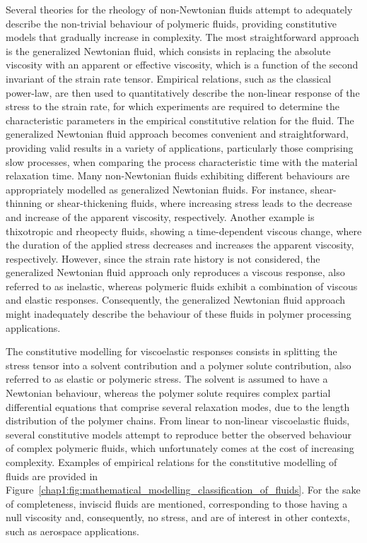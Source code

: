 Several theories for the rheology of non-Newtonian fluids attempt to adequately describe the non-trivial behaviour of polymeric fluids, providing constitutive models that gradually increase in complexity.
The most straightforward approach is the generalized Newtonian fluid, which consists in replacing the absolute viscosity with an apparent or effective viscosity, which is a function of the second invariant of the strain rate tensor.
Empirical relations, such as the classical power-law, are then used to quantitatively describe the non-linear response of the stress to the strain rate, for which experiments are required to determine the characteristic parameters in the empirical constitutive relation for the fluid.
The generalized Newtonian fluid approach becomes convenient and straightforward, providing valid results in a variety of applications, particularly those comprising slow processes, when comparing the process characteristic time with the material relaxation time.
Many non-Newtonian fluids exhibiting different behaviours are appropriately modelled as generalized Newtonian fluids.
For instance, shear-thinning or shear-thickening fluids, where increasing stress leads to the decrease and increase of the apparent viscosity, respectively.
Another example is thixotropic and rheopecty fluids, showing a time-dependent viscous change, where the duration of the applied stress decreases and increases the apparent viscosity, respectively.
However, since the strain rate history is not considered, the generalized Newtonian fluid approach only reproduces a viscous response, also referred to as inelastic, whereas polymeric fluids exhibit a combination of viscous and elastic responses.
Consequently, the generalized Newtonian fluid approach might inadequately describe the behaviour of these fluids in polymer processing applications.

The constitutive modelling for viscoelastic responses consists in splitting the stress tensor into a solvent contribution and a polymer solute contribution, also referred to as elastic or polymeric stress.
The solvent is assumed to have a Newtonian behaviour, whereas the polymer solute requires complex partial differential equations that comprise several relaxation modes, due to the length distribution of the polymer chains.
From linear to non-linear viscoelastic fluids, several constitutive models attempt to reproduce better the observed behaviour of complex polymeric fluids, which unfortunately comes at the cost of increasing complexity.
Examples of empirical relations for the constitutive modelling of fluids are provided in Figure~\ref{chap1:fig:mathematical_modelling_classification_of_fluids}.
For the sake of completeness, inviscid fluids are mentioned, corresponding to those having a null viscosity and, consequently, no stress, and are of interest in other contexts, such as aerospace applications.

